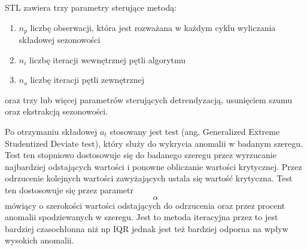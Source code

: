 \documentclass{article}
\begin{document}
STL zawiera trzy parametry sterujące metodą:

\begin{enumerate}
\def\labelenumi{\arabic{enumi}.}
\item
  \(n_{p}\) liczbę obserwacji, która jest rozważana w każdym cyklu
  wyliczania składowej sezonowości
\item
  \(n_{i}\) liczbę iteracji wewnętrznej pętli algorytmu
\item
  \(n_{o}\) liczbę iteracji pętli zewnętrznej
\end{enumerate}

oraz trzy lub więcej parametrów sterujących detrendyzacją, usunięciem
szumu oraz ekstrakcją sezonowości.

Po otrzymaniu składowej \(a_{t}\) stosowany jest test (ang. Generalized Extreme Studentized Deviate test), który służy do wykrycia anomalii w badanym szeregu. Test ten stopniowo dostosowuje się do badanego szeregu przez wyrzucanie najbardziej odstających wartości i ponowne obliczanie wartości krytycznej. Przez odrzucenie kolejnych wartości zawyżających  ustala się wartość krytyczna. Test ten dostosowuje się przez parametr \[\alpha\] mówiący o szerokości wartości odstających do odrzucenia oraz przez procent anomalii spodziewanych w szeregu. Jest to metoda iteracyjna przez to jest bardziej czasochłonna niż np IQR jednak jest też bardziej odporna na wpływ wysokich anomalii.   






\end{document}
